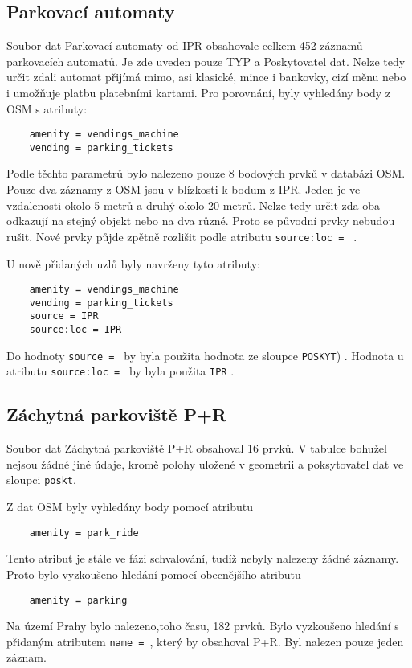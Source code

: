 \subsection{Parkovací automaty}
\label{Parkovací automaty}
Soubor dat Parkovací automaty od IPR obsahovale celkem 452 záznamů parkovacích
automatů. Je zde uveden pouze TYP a Poskytovatel dat. Nelze tedy určit zdali
automat přijímá mimo, asi klasické, mince i bankovky, cizí měnu nebo i umožňuje
platbu platebními kartami.
Pro porovnání, byly vyhledány body z OSM s atributy:
\begin{verbatim}
    amenity = vendings_machine
    vending = parking_tickets
\end{verbatim}
Podle těchto parametrů bylo nalezeno pouze 8 bodových prvků v databázi OSM.
Pouze dva záznamy z OSM jsou v blízkosti k bodum z IPR.
Jeden je ve vzdalenosti okolo 5 metrů a druhý okolo 20 metrů. Nelze tedy určit
zda oba odkazují na stejný objekt nebo na dva různé.
Proto se původní prvky nebudou rušit. Nové prvky půjde zpětně rozlišit podle
atributu {\tt source:loc~= } .

U nově přidaných uzlů byly navrženy tyto atributy:
\begin{verbatim}
    amenity = vendings_machine
    vending = parking_tickets
    source = IPR
    source:loc = IPR
\end{verbatim}
Do hodnoty {\tt source~= } by byla použita hodnota ze sloupce {\tt POSKYT}) .
Hodnota u atributu {\tt source:loc~= } by byla použita {\tt IPR} .

\subsection{Záchytná parkoviště P+R}
\label{Záchytná parkoviště P+R}
Soubor dat Záchytná parkoviště P+R obsahoval 16 prvků.
V tabulce bohužel nejsou žádné jiné údaje, kromě polohy uložené v geometrii
a poksytovatel dat ve sloupci {\tt poskt}.

Z dat OSM byly vyhledány body pomocí atributu
\begin{verbatim}
    amenity = park_ride
\end{verbatim}
Tento atribut je stále ve fázi schvalování, tudíž nebyly nalezeny žádné záznamy.
Proto bylo vyzkoušeno hledání pomocí obecnějšího atributu
\begin{verbatim}
    amenity = parking
\end{verbatim}
Na území Prahy bylo nalezeno,toho času, 182 prvků.
Bylo vyzkoušeno hledání s přidaným atributem {\tt name~= }, který by obsahoval P+R.
Byl nalezen pouze jeden záznam.


